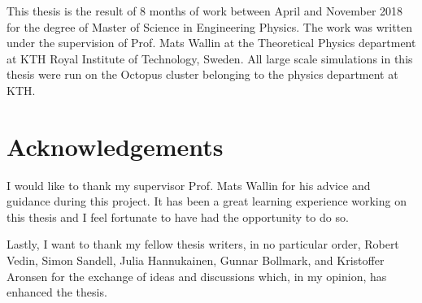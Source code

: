 This thesis is the result of 8 months of work between April and November 2018 for the degree of Master of Science in Engineering Physics. The work was written under the supervision of Prof. Mats Wallin at the Theoretical Physics department at KTH Royal Institute of Technology, Sweden. All large scale simulations in this thesis were run on the Octopus cluster belonging to the physics department at KTH.

\section*{Acknowledgements}

I would like to thank my supervisor Prof. Mats Wallin for his advice and guidance during this project. It has been a great learning experience working on this thesis and I feel fortunate to have had the opportunity to do so.

Lastly, I want to thank my fellow thesis writers, in no particular order, Robert Vedin, Simon Sandell, Julia Hannukainen, Gunnar Bollmark, and Kristoffer Aronsen for the exchange of ideas and discussions which, in my opinion, has enhanced the thesis.